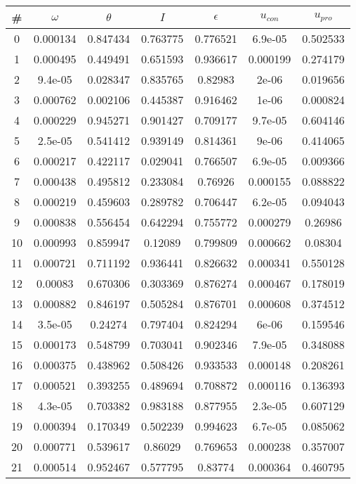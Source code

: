 \begin{table}
\begin{tabular}{c|c|c|c|c|c|c}
\# & $\omega$ & $\theta$ & $I$ & $\epsilon$ & $u_{con}$ & $u_{pro}$\\
\hline
0 & 0.000134 & 0.847434 & 0.763775 & 0.776521 & 6.9e-05 & 0.502533\\
1 & 0.000495 & 0.449491 & 0.651593 & 0.936617 & 0.000199 & 0.274179\\
2 & 9.4e-05 & 0.028347 & 0.835765 & 0.82983 & 2e-06 & 0.019656\\
3 & 0.000762 & 0.002106 & 0.445387 & 0.916462 & 1e-06 & 0.000824\\
4 & 0.000229 & 0.945271 & 0.901427 & 0.709177 & 9.7e-05 & 0.604146\\
5 & 2.5e-05 & 0.541412 & 0.939149 & 0.814361 & 9e-06 & 0.414065\\
6 & 0.000217 & 0.422117 & 0.029041 & 0.766507 & 6.9e-05 & 0.009366\\
7 & 0.000438 & 0.495812 & 0.233084 & 0.76926 & 0.000155 & 0.088822\\
8 & 0.000219 & 0.459603 & 0.289782 & 0.706447 & 6.2e-05 & 0.094043\\
9 & 0.000838 & 0.556454 & 0.642294 & 0.755772 & 0.000279 & 0.26986\\
10 & 0.000993 & 0.859947 & 0.12089 & 0.799809 & 0.000662 & 0.08304\\
11 & 0.000721 & 0.711192 & 0.936441 & 0.826632 & 0.000341 & 0.550128\\
12 & 0.00083 & 0.670306 & 0.303369 & 0.876274 & 0.000467 & 0.178019\\
13 & 0.000882 & 0.846197 & 0.505284 & 0.876701 & 0.000608 & 0.374512\\
14 & 3.5e-05 & 0.24274 & 0.797404 & 0.824294 & 6e-06 & 0.159546\\
15 & 0.000173 & 0.548799 & 0.703041 & 0.902346 & 7.9e-05 & 0.348088\\
16 & 0.000375 & 0.438962 & 0.508426 & 0.933533 & 0.000148 & 0.208261\\
17 & 0.000521 & 0.393255 & 0.489694 & 0.708872 & 0.000116 & 0.136393\\
18 & 4.3e-05 & 0.703382 & 0.983188 & 0.877955 & 2.3e-05 & 0.607129\\
19 & 0.000394 & 0.170349 & 0.502239 & 0.994623 & 6.7e-05 & 0.085062\\
20 & 0.000771 & 0.539617 & 0.86029 & 0.769653 & 0.000238 & 0.357007\\
21 & 0.000514 & 0.952467 & 0.577795 & 0.83774 & 0.000364 & 0.460795\\

\end{tabular}
\end{table}
